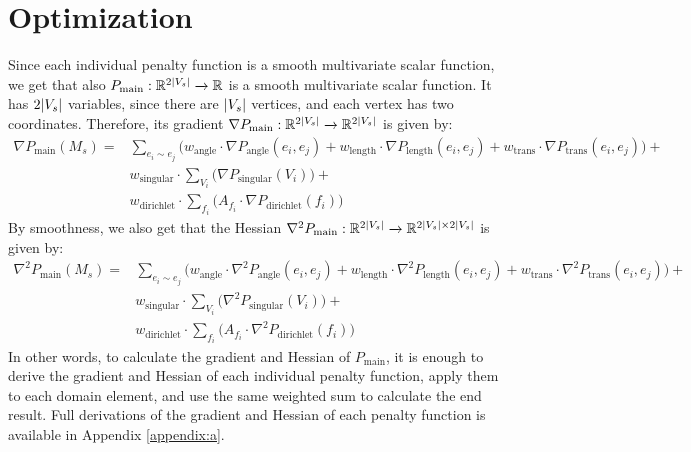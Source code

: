 \section{Optimization}
Since each individual penalty function is a smooth multivariate scalar function, we get that also $P_{\mathrm{main}}: \mathbb{R}^{2\lvert V_s\rvert} \xrightarrow[]{} \mathbb{R}$ is a smooth multivariate scalar function. It has $2\lvert V_s\rvert$ variables, since there are $\lvert V_s\rvert$ vertices, and each vertex has two coordinates. Therefore, its gradient $\nabla P_{\mathrm{main}}: \mathbb{R}^{2\lvert V_s\rvert} \xrightarrow[]{} \mathbb{R}^{2\lvert V_s\rvert}$ is given by:
\begin{equation}\label{eq:main_objective_function_gradient}
\begin{split}
\nabla P_{\mathrm{main}}\left(M_s\right) = &\sum_{e_i \sim e_j} \Big(w_{\mathrm{angle}} \cdot \nabla P_{\mathrm{angle}}\left(e_i,e_j\right) + w_{\mathrm{length}} \cdot \nabla P_{\mathrm{length}}\left(e_i,e_j\right) + w_{\mathrm{trans}} \cdot \nabla P_{\mathrm{trans}}\left(e_i,e_j\right)\Big) + \\
&w_{\mathrm{singular}} \cdot \sum_{V_i} \Big(\nabla P_{\mathrm{singular}}\left(V_i\right)\Big) +
\\
&w_{\mathrm{dirichlet}} \cdot \sum_{f_i} \Big(A_{f_i} \cdot \nabla P_{\mathrm{dirichlet}}\left(f_i\right)\Big)
\end{split}
\end{equation}
By smoothness, we also get that the Hessian $\nabla^2 P_{\mathrm{main}}: \mathbb{R}^{2\lvert V_s\rvert} \xrightarrow[]{} \mathbb{R}^{2\lvert V_s\rvert \times 2\lvert V_s\rvert}$ is given by:
\begin{equation}\label{eq:main_objective_function_gradient}
\begin{split}
\nabla^2 P_{\mathrm{main}}\left(M_s\right) = &\sum_{e_i \sim e_j} \Big(w_{\mathrm{angle}} \cdot \nabla^2 P_{\mathrm{angle}}\left(e_i,e_j\right) + w_{\mathrm{length}} \cdot \nabla^2 P_{\mathrm{length}}\left(e_i,e_j\right) + w_{\mathrm{trans}} \cdot \nabla^2 P_{\mathrm{trans}}\left(e_i,e_j\right)\Big) + \\
&w_{\mathrm{singular}} \cdot \sum_{V_i} \Big(\nabla^2 P_{\mathrm{singular}}\left(V_i\right)\Big) +
\\
&w_{\mathrm{dirichlet}} \cdot \sum_{f_i} \Big(A_{f_i} \cdot \nabla^2 P_{\mathrm{dirichlet}}\left(f_i\right)\Big)
\end{split}
\end{equation}
In other words, to calculate the gradient and Hessian of $P_{\mathrm{main}}$, it is enough to derive the gradient and Hessian of each individual penalty function, apply them to each domain element, and use the same weighted sum to calculate the end result. Full derivations of the gradient and Hessian of each penalty function is available in Appendix \ref{appendix:a}.

